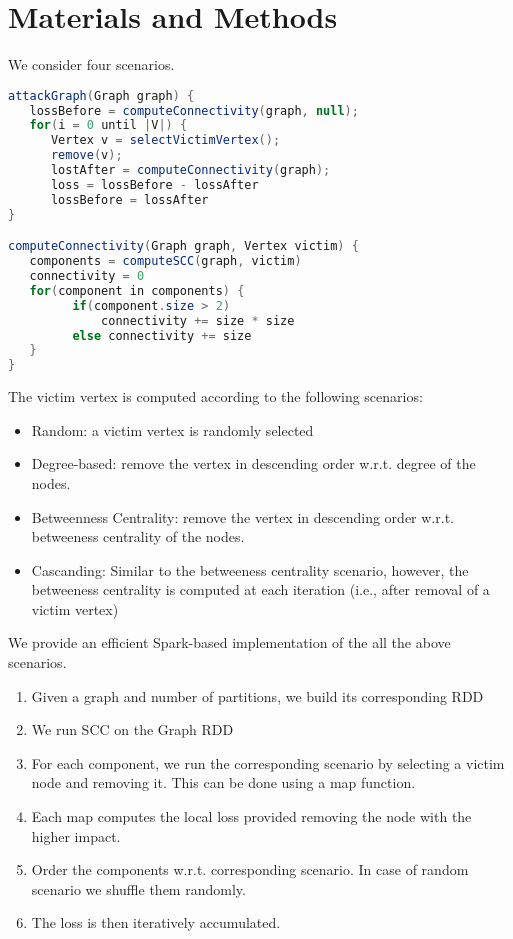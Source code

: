 \section{Materials and Methods}
We consider four scenarios.

\begin{lstlisting}[language=java]
attackGraph(Graph graph) {
   lossBefore = computeConnectivity(graph, null);
   for(i = 0 until |V|) {
      Vertex v = selectVictimVertex();
      remove(v);
      lostAfter = computeConnectivity(graph);
      loss = lossBefore - lossAfter
      lossBefore = lossAfter
}

computeConnectivity(Graph graph, Vertex victim) {
   components = computeSCC(graph, victim)
   connectivity = 0
   for(component in components) {
         if(component.size > 2) 
             connectivity += size * size
         else connectivity += size
   }
}
\end{lstlisting} 

The victim vertex is computed according to the following scenarios: 
\begin{itemize}
\item Random: a victim vertex is randomly selected
\item Degree-based: remove the vertex in descending order w.r.t. degree of the nodes. 
\item Betweenness Centrality: remove the vertex in descending order w.r.t. betweeness centrality of the nodes.
\item Cascanding: Similar to the betweeness centrality scenario, however, the betweeness centrality is computed at each iteration (i.e., after removal of a victim vertex)
\end{itemize}

We provide an efficient Spark-based implementation of the all the above scenarios. 

\begin{enumerate}
\item Given a graph and number of partitions, we build its corresponding RDD
\item We run SCC on the Graph RDD
\item For each component, we run the corresponding scenario by selecting a victim node and removing it. This can be done using a map function.
\item Each map computes the local loss provided removing the node with the higher impact.
\item Order the components w.r.t. corresponding scenario. In case of random scenario we shuffle them randomly. 
\item The loss is then iteratively accumulated.
\end{enumerate}

